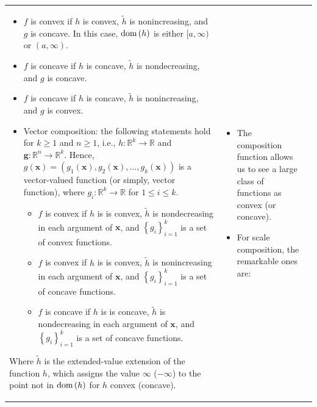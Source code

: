 \documentclass{article}
\newcommand{\dom}[1]{\ensuremath{\textnormal{dom}\left(#1\right)}} %
\begin{document}
\begin{xltabular}{\textwidth}{|>{\setlength\hsize{1\hsize}\setlength\linewidth{\hsize}}X|>{\setlength\hsize{.9\hsize}\setlength\linewidth{\hsize}}X|>{\setlength\hsize{1.1\hsize}\setlength\linewidth{\hsize}}X|}
\begin{itemize}[leftmargin=*]
\begin{itemize}[label=\(\triangleright\)]
			      \item \(f\) is convex if \(h\) is convex, \(\tilde{h}\) is nonincreasing, and \(g\) is concave. In this case, \(\dom{h}\) is either \([a, \infty)\) or \((a, \infty)\).
			      \item \(f\) is concave if \(h\) is concave, \(\tilde{h}\) is nondecreasing, and \(g\) is concave.
			      \item \(f\) is concave if \(h\) is concave, \(\tilde{h}\) is nonincreasing, and \(g\) is convex.
		      \end{itemize}
	\end{itemize}
	\begin{itemize}[leftmargin=*]
		\item Vector composition: the following statements hold for \(k\geq 1\) and \(n\geq 1\), i.e., \(h: \mathbb{R}^{k} \rightarrow \mathbb{R}\) and \(\boldsymbol{g}: \mathbb{R}^{n} \rightarrow \mathbb{R}^{k}\). Hence, \(g(\mathbf{x}) = (g_1 (\mathbf{x}), g_2(\mathbf{x}), \dots, g_k(\mathbf{x}))\) is a vector-valued function (or simply, vector function), where \(g_i: \mathbb{R}^{k} \rightarrow \mathbb{R}\) for \(1 \leq i \leq k\).
		      \begin{itemize}[label=\(\triangleright\)]
			      \item \(f\) is convex if \(h\) is is convex, \(\tilde{h}\) is nondecreasing in each argument of \(\mathbf{x}\), and \(\left\{ g_i \right\}_{i=1}^{k}\) is a set of convex functions.
			      \item \(f\) is convex if \(h\) is is convex, \(\tilde{h}\) is nonincreasing in each argument of \(\mathbf{x}\), and \(\left\{ g_i \right\}_{i=1}^{k}\) is a set of concave functions.
			      \item \(f\) is concave if \(h\) is is concave, \(\tilde{h}\) is nondecreasing in each argument of \(\mathbf{x}\), and \(\left\{ g_i \right\}_{i=1}^{k}\) is a set of concave functions.
		      \end{itemize}
	\end{itemize}
	Where \(\tilde{h}\) is the extended-value extension of the function \(h\), which assigns the value \(\infty\) (\(-\infty\)) to the point not in \(\dom{h}\) for \(h\) convex (concave).
	& \vspace{-3.5ex}
	\begin{itemize}[leftmargin=*]
		\item The composition function allows us to see a large class of functions as convex (or concave).
		\item For scale composition, the remarkable ones are:

\end{itemize}
\end{xltabular}
\end{document}
